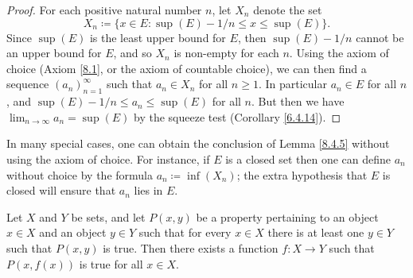 \begin{proof}
    For each positive natural number \(n\), let \(X_n\) denote the set
    \[
        X_n \coloneqq \{x \in E : \sup(E) - 1 / n \leq x \leq \sup(E)\}.
    \]
    Since \(\sup(E)\) is the least upper bound for \(E\), then \(\sup(E) - 1 / n\) cannot be an upper bound for \(E\), and so \(X_n\) is non-empty for each \(n\).
    Using the axiom of choice (Axiom \ref{8.1}, or the axiom of countable choice), we can then find a sequence \((a_n)_{n = 1}^\infty\) such that \(a_n \in X_n\) for all \(n \geq 1\).
    In particular \(a_n \in E\) for all \(n\), and \(\sup(E) - 1 / n \leq a_n \leq \sup(E)\) for all \(n\).
    But then we have \(\lim_{n \to \infty} a_n = \sup(E)\) by the squeeze test (Corollary \ref{6.4.14}).
\end{proof}

\begin{remark}\label{8.4.6}
    In many special cases, one can obtain the conclusion of Lemma \ref{8.4.5} without using the axiom of choice.
    For instance, if \(E\) is a closed set then one can define \(a_n\) without choice by the formula \(a_n \coloneqq \inf(X_n)\);
    the extra hypothesis that \(E\) is closed will ensure that \(a_n\) lies in \(E\).
\end{remark}

\begin{proposition}\label{8.4.7}
    Let \(X\) and \(Y\) be sets, and let \(P(x, y)\) be a property pertaining to an object \(x \in X\) and an object \(y \in Y\) such that for every \(x \in X\) there is at least one \(y \in Y\) such that \(P(x, y)\) is true.
    Then there exists a function \(f : X \to Y\) such that \(P(x, f(x))\) is true for all \(x \in X\).
\end{proposition}

